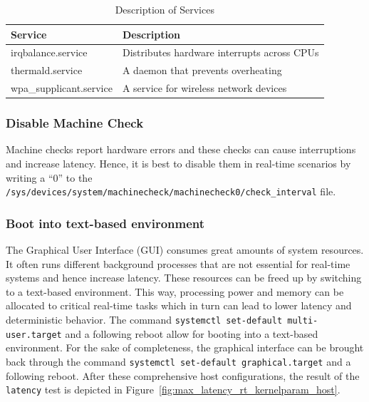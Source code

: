 \documentclass[MMR,Master,english]{twbook}
\begin{document}
\begin{table}[H]
	\centering
	\caption{Description of Services}
	\label{tab:stop_servies}
	\setlength{\tabcolsep}{0.5em} %
	{\renewcommand{\arraystretch}{1.2}%
		\begin{tabular}{|l|l|}
			\hline
			\textbf{Service}        & \textbf{Description}                        \\
			\hline
			irqbalance.service      & Distributes hardware interrupts across CPUs \\\hline
			thermald.service        & A daemon that prevents overheating          \\\hline
			wpa\_supplicant.service & A service for wireless network devices      \\
			\hline
		\end{tabular}}
\end{table}
\subsubsection{Disable Machine Check}
Machine checks report hardware errors and these checks can cause interruptions and increase latency. Hence, it is best to disable them in real-time scenarios by writing a ``0'' to the \texttt{/sys/devices/system/machinecheck/machinecheck0/check\_interval} file.

\subsubsection{Boot into text-based environment}
The Graphical User Interface (GUI) consumes great amounts of system resources. It often runs different background processes that are not essential for real-time systems and hence increase latency. These resources can be freed up by switching to a text-based environment. This way, processing power and memory can be allocated to critical real-time tasks which in turn can lead to lower latency and deterministic behavior. The command \texttt{systemctl set-default multi-user.target} and a following reboot allow for booting into a text-based environment. For the sake of completeness, the graphical interface can be brought back through the command \texttt{systemctl set-default graphical.target} and a following reboot.
\clearpage
\noindent After these comprehensive host configurations, the result of the \texttt{latency} test is depicted in Figure~\ref{fig:max_latency_rt_kernelparam_host}. 
\end{document}

